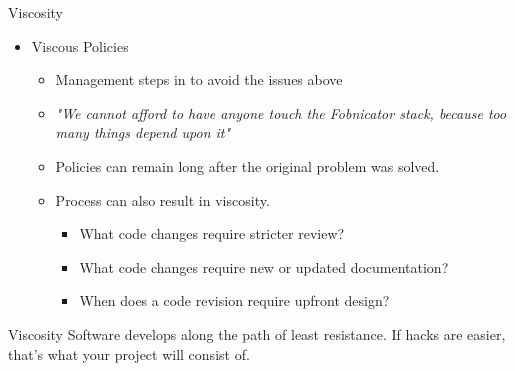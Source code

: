 \documentclass[xcolor=svgnames]{beamer}
\begin{document}

{%
%
\begin{frame}{Viscosity}
    \begin{itemize}
        \item Viscous Policies
        \begin{itemize}
            \item<1->Management steps in to avoid the issues above
            \item<2->\textit{"We cannot afford to have anyone touch the
                Fobnicator stack, because too many things depend upon it"}
            \item<3->Policies can remain long after the original problem was
                solved.
            \item<4->Process can also result in viscosity.
            \begin{itemize}
                \item<5->What code changes require stricter review?
                \item<6->What code changes require new or updated documentation?
                \item<7->When does a code revision require upfront design?
            \end{itemize}
        \end{itemize}
    \end{itemize}
\end{frame}
}




{%
%
\begin{frame}{Viscosity}
    Software develops along the path of least resistance.  If hacks are easier,
            that's what your project will consist of.
\end{frame}
}
\end{document}
